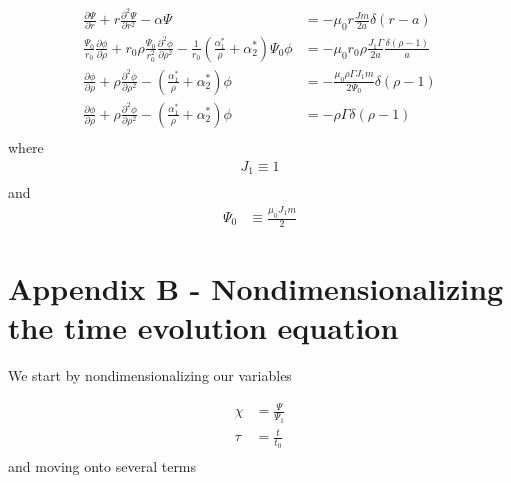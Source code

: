 \documentclass{article}
\begin{document}
\begin{equation} \label{wessonCurrentProfile}
\begin{split}
 \frac{\partial \Psi}{\partial r} +r   \frac{\partial^2 \Psi}{\partial r^2} - \alpha \Psi & = - \mu_0r  \frac{Jm}{2a} \delta (r-a)\\ 
 \frac{\Psi_0}{r_0} \frac{\partial \phi}{\partial \rho} + r_0 \rho \frac{\Psi_0}{r_0^2}   \frac{\partial^2 \phi}{\partial \rho^2} - \frac{1}{r_0}\left( \frac{\alpha_1^*}{\rho}+\alpha_2^*\right) \Psi_0 \phi & = - \mu_0 r_0 \rho \frac{J_1 \Gamma}{2a} \frac{\delta (\rho - 1)}{a}\\
\frac{\partial \phi}{\partial \rho} + \rho   \frac{\partial^2 \phi}{\partial \rho^2} - \left( \frac{\alpha_1^*}{\rho}+\alpha_2^*\right) \phi & = - \frac{\mu_0 \rho \Gamma J_1 m}{2 \Psi_0} \delta (\rho - 1)\\
\frac{\partial \phi}{\partial \rho} + \rho   \frac{\partial^2 \phi}{\partial \rho^2} - \left( \frac{\alpha_1^*}{\rho}+\alpha_2^*\right)\phi & = - \rho \Gamma \delta (\rho - 1)\\
\end{split} 
\end{equation} 
where
\begin{equation} \label{wessonCurrentProfile}
\begin{split}
J_1 \equiv 1 \\
\end{split} 
\end{equation} 
and
\begin{equation} \label{wessonCurrentProfile}
\begin{split}
\Psi_0 & \equiv  \frac{\mu_0 J_1 m}{2}
\end{split} 
\end{equation} 


\section*{Appendix B - Nondimensionalizing the time evolution equation}

We start by nondimensionalizing our variables

\begin{equation} \label{wessonCurrentProfile}
\begin{split}
\chi & = \frac{\Psi}{\Psi_1}\\
\tau & = \frac{t}{t_0}\\
\end{split} 
\end{equation} 
and moving onto several terms
\end{document}
